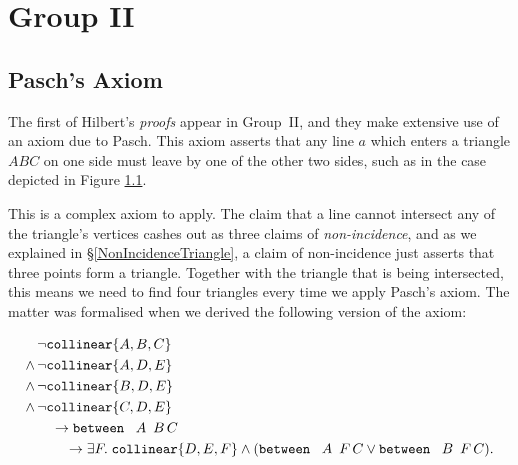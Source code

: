 \chapter{Group II}\label{chapter:Group2}
\section{Pasch's Axiom}
The first of Hilbert's \emph{proofs} appear in Group~II, and they make extensive use of an axiom due to Pasch. This axiom asserts that any line $a$ which enters a triangle $ABC$ on one side must leave by one of the other two sides, such as in the case depicted in Figure \ref{PaschDiagram}.

\begin{figure}\label{PaschDiagram}
\end{figure}

This is a complex axiom to apply. The claim that a line cannot intersect any of the triangle's vertices cashes out as three claims of \emph{non-incidence}, and as we explained in \S\ref{NonIncidenceTriangle}, a claim of non-incidence just asserts that three points form a triangle. Together with the triangle that is being intersected, this means we need to find four triangles every time we apply Pasch's axiom. The matter was formalised when we derived the following version of the axiom:

\begin{align*}
&\neg\texttt{collinear}\{A, B, C\}\\
\wedge\,&\neg\texttt{collinear}\{A, D, E\}\\
\wedge\,&\neg\texttt{collinear}\{B, D, E\}\\
\wedge\,&\neg\texttt{collinear}\{C, D, E\}\\
&\quad\rightarrow\texttt{between}\ \,\ A\ \,B\,C \\
&\qquad\rightarrow\exists F.\; \texttt{collinear} \{D, E, F\} \wedge (\texttt{between}\ \,\ A\ \,F\,C \vee \texttt{between}\ \,\ B\ \,F\,C).
\end{align*}

